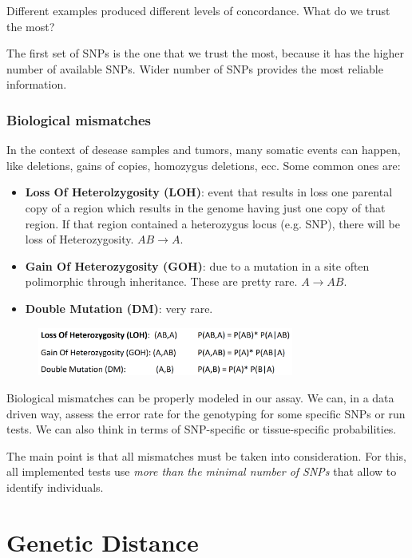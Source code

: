 Different examples produced different levels of concordance. What do we trust
the most?

The first set of SNPs is the one that we trust the most, because it has the
higher number of available SNPs. Wider number of SNPs provides the most reliable
information. 

\subsubsection{Biological mismatches}

In the context of desease samples and tumors, many somatic events can happen,
like deletions, gains of copies, homozygus deletions, ecc. Some common ones are:
\begin{itemize}
	\item  \textbf{Loss Of Heterolzygosity (LOH)}:  event that results in loss
	one parental copy of a region which results in the genome having just one
	copy of that region. If that region contained a heterozygus locus (e.g.
	SNP), there will be loss of Heterozygosity. $AB \rightarrow A$.
	\item \textbf{Gain Of Heterozygosity (GOH)}: due to a mutation in a site
	often polimorphic through inheritance. These are pretty rare. $A \rightarrow
	AB$. 
	\item \textbf{Double Mutation (DM)}: very rare.  
\end{itemize}

\begin{figure}[h]
	\centering
	\includegraphics[width=0.75\textwidth]{heterozygosity.PNG}
	\caption{} 
	\label{fig: heterozygosity}
\end{figure}

\bigskip
Biological mismatches can be properly modeled in our assay. We can, in a data
driven way, assess the error rate for the genotyping for some specific SNPs or
run tests. We can also think in terms of SNP-specific or tissue-specific
probabilities.

The main point is that all mismatches must be taken into consideration. For
this, all implemented tests use \emph{more than the minimal number of SNPs} that
allow to identify individuals. 


\section{Genetic Distance}

